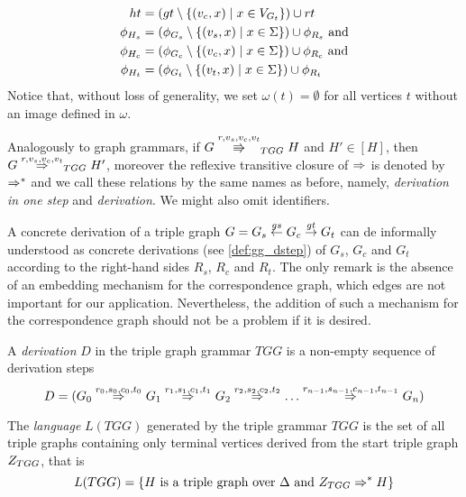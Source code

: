 \begin{definition}
\begin{align*}
		ht		& = (gt \setminus \{(v_c,x) \; | \; x \in V_{G_t}\}) \cup rt  \\
		\phi_{H_s} & = (\phi_{G_s} \setminus \{(v_s,x) \; | \; x \in \Sigma\}) \cup \phi_{R_s} \text{ and}\\
		\phi_{H_c} & = (\phi_{G_c} \setminus \{(v_c,x) \; | \; x \in \Sigma\}) \cup \phi_{R_c} \text{ and}\\
		\phi_{H_t} & = (\phi_{G_t} \setminus \{(v_t,x) \; | \; x \in \Sigma\}) \cup \phi_{R_t}\\
	\end{align*}
	Notice that, without loss of generality, we set $\omega(t) = \emptyset$ for all vertices $t$ without an image defined in $\omega$.
	
	Analogously to graph grammars, if $G \cderiv{r}{v_s,v_c,v_t}{TGG} H$ and $H' \in [H]$, then $G \tderiv{r}{v_s,v_c,v_t}{TGG} H'$, moreover the reflexive transitive closure of $\tderiv{}{}{}$ is denoted by $\Rightarrow^*_{}$ and we call these relations by the same names as before, namely, \emph{derivation in one step} and \emph{derivation}. We might also omit identifiers.
\end{definition}

A concrete derivation of a triple graph $G = G_s \overset{gs}{\leftarrow} G_c \overset{gt}{\rightarrow} G_t$ can de informally understood as concrete derivations (see \ref{def:gg_dstep}) of $G_s$, $G_c$ and $G_t$ according to the right-hand sides $R_s$, $R_c$ and $R_t$. The only remark is the absence of an embedding mechanism for the correspondence graph, which edges are not important for our application. Nevertheless, the addition of such a mechanism for the correspondence graph should not be a problem if it is desired.

\begin{definition}
	A \emph{derivation} $D$ in the triple graph grammar $TGG$ is a non-empty sequence of derivation steps
	\[ 
		D = (G_0 \tderiv{r_0}{s_0,c_0,t_0}{} G_1 \tderiv{r_1}{s_1,c_1,t_1}{} G_2 \tderiv{r_2}{s_2,c_2,t_2}{} \dots \tderiv{r_{n-1}}{s_{n-1},c_{n-1},t_{n-1}}{} G_n)
	\]
\end{definition}

\begin{definition}
	\label{def:tlanguage}
	The \emph{language} $L(TGG)$ generated by the triple grammar $TGG$ is the set of all triple graphs containing only terminal vertices derived from the start triple graph $Z_{TGG}$, that is
	\[
		L(TGG) = \{H \text{ is a triple graph over } \Delta \text{ and } Z_{TGG} \Rightarrow^*_{} H\}
	\]
\end{definition}

